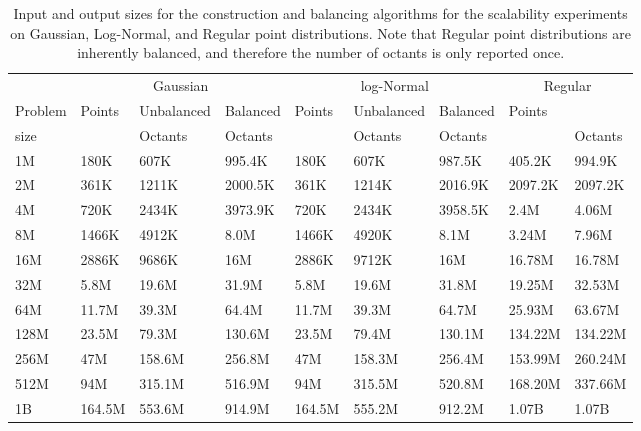 \begin{table} 
  \tiny
  \begin{center}
  \begin{tabular}{|l|l|l|l|l|l|l|l|l|} \hline 
   & \multicolumn{3}{c|}{Gaussian} & \multicolumn{3}{c|}{log-Normal} & \multicolumn{2}{c|}{Regular} \\ 
   \cline{2-9}
    Problem   & Points &  Unbalanced &  Balanced & Points &  Unbalanced  & Balanced & Points &  \\
    size      &   &  Octants &  Octants &   &  Octants  &  Octants &   &  Octants  \\\hline
    1M & 180K  & 607K & 995.4K &180K& 607K &987.5K & 405.2K  & 994.9K \\
    2M & 361K & 1211K & 2000.5K &361K &1214K &2016.9K & 2097.2K & 2097.2K\\
    4M & 720K & 2434K & 3973.9K &720K &2434K &3958.5K & 2.4M & 4.06M \\
    8M & 1466K & 4912K & 8.0M &1466K &4920K &8.1M & 3.24M  & 7.96M \\
    16M & 2886K & 9686K & 16M &2886K &9712K &16M & 16.78M & 16.78M \\
    32M & 5.8M & 19.6M & 31.9M &5.8M &19.6M &31.8M & 19.25M & 32.53M\\
    64M & 11.7M &  39.3M & 64.4M &11.7M &39.3M &64.7M & 25.93M & 63.67M\\
    128M & 23.5M & 79.3M & 130.6M &23.5M &79.4M &130.1M & 134.22M & 134.22M\\
    256M  & 47M & 158.6M & 256.8M &47M &158.3M &256.4M & 153.99M  &  260.24M\\
    512M & 94M & 315.1M & 516.9M  &94M &315.5M &520.8M & 168.20M   &  337.66M\\ 
    1B  & 164.5M &553.6M &914.9M &164.5M &555.2M &912.2M& 1.07B & 1.07B \\ \hline
  \end{tabular}
\end{center}
 \label{tab:numbers}	
 \caption{Input and output sizes for the construction and balancing algorithms for the scalability experiments on Gaussian, Log-Normal, and Regular point distributions. Note that Regular point distributions are inherently balanced, and therefore the number of octants is only reported once.}
 \end{table}


